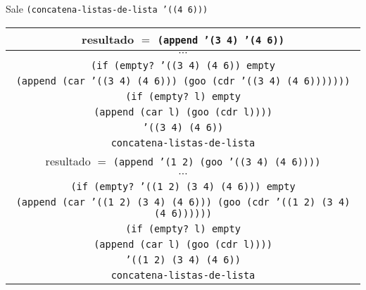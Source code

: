 \documentclass[letterpaper,11pt]{article}
\begin{document}
\begin{enumerate}
\begin{enumerate}
        Sale \texttt{(concatena-listas-de-lista '((4 6)))}
        \begin{center}
            \begin{tabular}{|c|}
                \hline
                resultado $=$ \texttt{(append '(3 4) '(4 6))}  \\
                \hline
                $\cdots$ \\
                \hline
                \texttt{(if (empty? '((3 4) (4 6)) empty} \\
                \texttt{(append (car '((3 4) (4 6))) 
                (goo (cdr '((3 4) (4 6)))))))} \\
                \hline
                \texttt{(if (empty? l) empty} \\
                \texttt{(append (car l) (goo (cdr l))))} \\
                \hline
                \texttt{'((3 4) (4 6))} \\
                \hline
                \texttt{concatena-listas-de-lista} \\
                \hline
                \hline
                resultado $=$ \texttt{(append '(1 2) (goo '((3 4) (4 6))))}  \\
                \hline
                $\cdots$ \\
                \hline
                \texttt{(if (empty? '((1 2) (3 4) (4 6))) empty} \\
                \texttt{(append (car '((1 2) (3 4) (4 6))) 
                (goo (cdr '((1 2) (3 4) (4 6))))))} \\
                \hline
                \texttt{(if (empty? l) empty} \\
                \texttt{(append (car l) (goo (cdr l))))} \\
                \hline
                \texttt{'((1 2) (3 4) (4 6))} \\
                \hline
                \texttt{concatena-listas-de-lista} \\
                \hline
            \end{tabular}
        \end{center}


\end{enumerate}
\end{enumerate}
\end{document}
